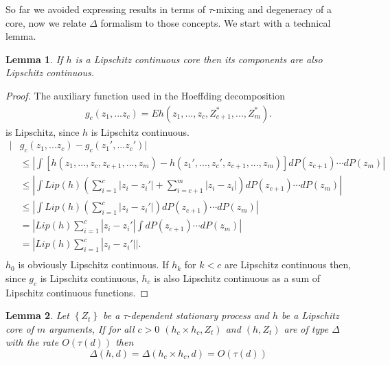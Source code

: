 \documentclass{article} %
\newtheorem{lemma}{Lemma}
\newcommand{\ev}{E}
\begin{document}
So far we  avoided expressing results in terms of $\tau$-mixing and degeneracy of a core, now we relate $\varDelta$ formalism to those concepts. We start with a technical lemma. 
\begin{lemma}
\label{stm:LipAndBound}
 If $h$ is a  Lipschitz continuous core then its components are also Lipschitz continuous.
\end{lemma}
\begin{proof}
The auxiliary function  used in the Hoeffding decomposition
\begin{align*}
g_c(z_1,...z_c) = \ev h(z_1,...,z_c,Z_{c+1}^*,...,Z_{m}^*).  
\end{align*}
is Lipschitz, since $h$ is Lipschitz continuous.
\begin{align*}
|&g_c(z_1,...z_c) - g_c(z_1',...z_c')| \\
 &\leq \left| \int    [h(z_1,...,z_c,z_{c+1},...,z_{m}) - h(z_1',...,z_c',z_{c+1},...,z_{m}) ] dP(z_{c+1}) \cdots dP(z_m)\right| \\
 &\leq \left| \int    Lip(h) \left(  \sum_{i=1}^c | z_i - z_i'| + \sum_{i=c+1}^m | z_i - z_i|  \right)  dP(z_{c+1})  \cdots dP(z_m) \right| \\
  &\leq \left| \int    Lip(h) \left(  \sum_{i=1}^c | z_i - z_i'|   \right)   dP(z_{c+1})  \cdots dP(z_m) \right| \\
& = | Lip(h)   \sum_{i=1}^c | z_i - z_i'| \int  dP(z_{c+1})   \cdots dP(z_m)  |  \\
& = | Lip(h)   \sum_{i=1}^c | z_i - z_i'|  |.  \\
\end{align*}
$h_0$ is obviously Lipschitz continuous. If $h_{k}$ for $k<c$ are Lipschitz continuous then, since $g_c$ is Lipschitz continuous, $h_c$ is also Lipschitz continuous as a sum of Lipschitz continuous functions.
\end{proof}
\begin{lemma}
\label{lem:disentangle}
Let $\left\{ Z_{t}\right\} $ be a $\tau$-dependent stationary process and $h$ be a Lipschitz  core of $m$ arguments, If   for all $c>0$
$(h_c \times h_c,Z_t)$ and $(h,Z_t)$  are of type $\varDelta$ with the rate  $O(\tau(d))$ then 
\[
 \varDelta(h,d) =\varDelta(h_c \times h_c,d)  = O(\tau(d))
\]
\end{lemma}
\end{document}
